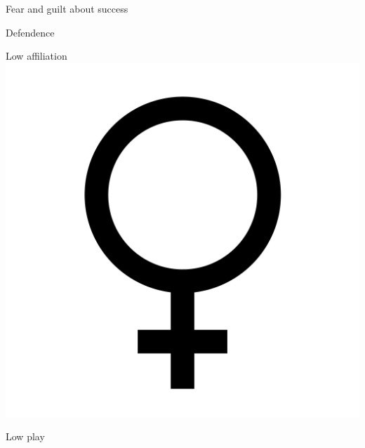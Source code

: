 \documentclass[aspectratio=169]{beamer}
\begin{document}
\begin{frame}
  \begin{center}
    \Huge Fear and guilt about success
    \\ \small \cite{sakulku11}
  \end{center}
\end{frame}

\begin{frame}
  \begin{center}
    \Huge Defendence
    \\ \small \cite{langford93}
  \end{center}
\end{frame}

\begin{frame}
  \begin{center}
    \Huge Low affiliation \\
    \includegraphics[scale=.025]{./assets/women.png}
    \\ \small \cite{langford93}
  \end{center}
\end{frame}

\begin{frame}
  \begin{center}
    \Huge Low play
    \\ \small \cite{langford93}
  \end{center}
\end{frame}
\end{document}
